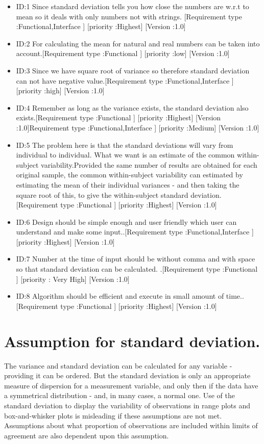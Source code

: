 \documentclass{article}
\begin{document}
\begin{itemize}
  \item ID:1 Since standard deviation tells you how close the numbers are w.r.t to mean so it deals with only numbers not with strings.	[Requirement type :Functional,Interface ] [priority :Highest] [Version :1.0]
  \item ID:2 For calculating the mean for natural and real numbers can be taken into account.[Requirement type :Functional ] [priority :low] [Version :1.0]
  \item ID:3 Since we have square root of variance so therefore standard deviation can not have negative value.[Requirement type :Functional,Interface ] [priority :high] [Version :1.0]
  \item ID:4 Remember as long as the variance exists, the standard deviation also exists.[Requirement type :Functional ] [priority :Highest] [Version :1.0]Requirement type :Functional,Interface ] [priority :Medium] [Version :1.0]
  \item ID:5 The problem here is that the standard deviations will vary from individual to individual. What we want is an estimate of the common within-subject variability.Provided the same number of results are obtained for each original sample, the common within-subject variability can estimated by estimating the mean of their individual variances - and then taking the square root of this, to give the within-subject standard deviation.[Requirement type :Functional ] [priority :Highest] [Version :1.0]
  \item ID:6 Design should be simple enough and user friendly which user can understand and make some input..[Requirement type :Functional,Interface ] [priority :Highest] [Version :1.0]
  \item ID:7 Number at the time of input should be without comma and with space so that standard deviation can be calculated. .[Requirement type :Functional ] [priority : Very High] [Version :1.0]
  \item ID:8 Algorithm should be efficient and execute in small amount of time..[Requirement type :Functional ] [priority :Highest] [Version :1.0]

  
\end{itemize}

\section{Assumption for standard deviation.}

The variance and standard deviation can be calculated for any variable - providing it can be ordered. But the standard deviation is only an appropriate measure of dispersion for a measurement variable, and only then if the data have a symmetrical distribution - and, in many cases, a normal one. Use of the standard deviation to display the variability of observations in range plots and box-and-whisker plots is misleading if these assumptions are not met. Assumptions about what proportion of observations are included within limits of agreement are also dependent upon this assumption.
\end{document}
